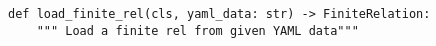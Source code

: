 \begin{verbatim}
def load_finite_rel(cls, yaml_data: str) -> FiniteRelation:
    """ Load a finite rel from given YAML data"""
\end{verbatim}